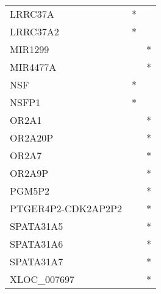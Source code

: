 \begin{tabular}{lcc}
LRRC37A            &              * &            \\
LRRC37A2           &              * &            \\
MIR1299            &                &          * \\
MIR4477A           &                &          * \\
NSF                &              * &            \\
NSFP1              &              * &            \\
OR2A1              &                &          * \\
OR2A20P            &                &          * \\
OR2A7              &                &          * \\
OR2A9P             &                &          * \\
PGM5P2             &                &          * \\
PTGER4P2-CDK2AP2P2 &                &          * \\
SPATA31A5          &                &          * \\
SPATA31A6          &                &          * \\
SPATA31A7          &                &          * \\
XLOC\_007697        &                &          * \\
\bottomrule
\end{tabular}
